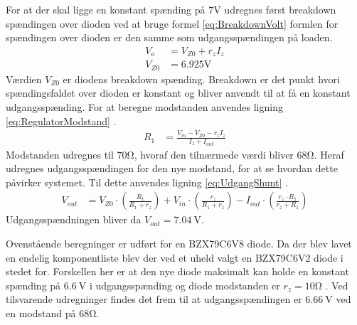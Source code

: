 For at der skal ligge en konstant spænding på $7 \si{\volt}$ udregnes først breakdown spændingen over dioden ved at bruge formel \ref{eq:BreakdownVolt} \cite[Side. 146]{Sedra19uu} formlen for spændingen over dioden er den samme som udgangsspændingen på loaden. 
\begin{align}
	V_o & = V_{Z0} + r_z I_z \label{eq:BreakdownVolt} \\
	V_{Z0} & = 6.925 \si{\volt}
	\end{align}
Værdien $V_{Z0}$ er diodens breakdown spænding.
Breakdown er det punkt hvori spændingsfaldet over dioden er konstant og bliver anvendt til at få en konstant udgangsspænding.
For at beregne modstanden anvendes ligning \ref{eq:RegulatorModstand} \cite[Side. 149]{Sedra19uu}.
\begin{align}
	R_1 & = \frac{V_{in}-V_{Z0}-r_z I_z}{I_z+I_{out}} \label{eq:RegulatorModstand}
\end{align}
Modstanden udregnes til $70 \si{\ohm}$, hvoraf den tilnærmede værdi bliver $68 \si{\ohm}$.
Heraf udregnes udgangsspændingen for den nye modstand, for at se hvordan dette påvirker systemet.
Til dette anvendes ligning \ref{eq:UdgangShunt} \cite[Side. 149]{Sedra19uu}.
\begin{align}
	V_{out} & = V_{Z0} \cdot \left( \frac{R_1}{R_1+r_z} \right) + V_{in} \cdot \left( \frac{r_z}{R_1+r_z} \right) - I_{out} \cdot \left( \frac{r_z \cdot R_1}{r_z+R_1} \right) \label{eq:UdgangShunt}
\end{align}
Udgangsspændningen bliver da $V_{out} = \SI{7.04}{\volt}$.

Ovenstående beregninger er udført for en BZX79C6V8 diode. 
Da der blev lavet en endelig komponentliste blev der ved et uheld valgt en BZX79C6V2 diode i stedet for. 
Forskellen her er at den nye diode maksimalt kan holde en konstant spænding på $\SI{6.6}{\volt}$ i udgangsspænding og diode modstanden er $r_z = 10 \si{\ohm}$ \cite[Side. 1 Kolonne 11]{ZenerDiode}.
Ved tilsvarende udregninger findes det frem til at udgangsspændingen er $\SI{6.66}{\volt}$ ved en modstand på $68 \si{\ohm}$.
